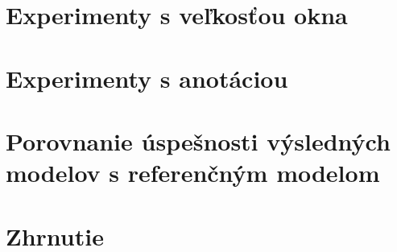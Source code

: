 

\section{Experimenty s veľkosťou okna}

\section{Experimenty s anotáciou}


\section{Porovnanie úspešnosti výsledných modelov s referenčným modelom}

\section{Zhrnutie}
